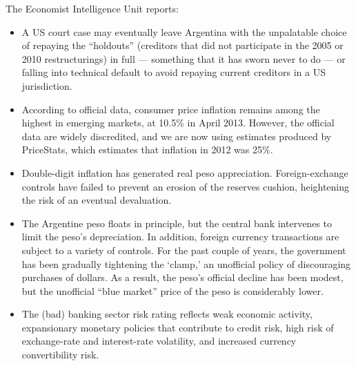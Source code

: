 \documentclass[letterpaper,12pt]{exam}
\begin{document}
\begin{questions}
The Economist Intelligence Unit reports:
\begin{itemize}
\item A US court case may eventually leave
Argentina with the unpalatable choice of repaying the ``holdouts'' (creditors that
did not participate in the 2005 or 2010 restructurings) in full --- something that it
has sworn never to do --- or falling into technical default to avoid repaying
current creditors in a US jurisdiction.

\item According to official data, consumer price inflation remains among the highest
in emerging markets, at 10.5\% in April 2013. However, the official data are
widely discredited, and we are now using estimates produced by PriceStats,
which estimates that inflation in 2012 was 25\%.

\item Double-digit inflation has generated real peso appreciation.
Foreign-exchange controls have failed to prevent an erosion of the reserves cushion,
heightening the risk of an eventual devaluation.

\item The Argentine peso floats in principle, but the central bank intervenes to limit
the peso's depreciation.
In addition, foreign currency transactions are subject to a variety of controls.
For the past couple of years, the government has been gradually tightening the `clamp,'
an unofficial policy of discouraging purchases of dollars.
As a result, the peso's official decline has been modest,
but the unofficial ``blue market'' price of the peso is considerably lower.

\item The (bad) banking sector risk rating reflects weak economic activity, expansionary
monetary policies that contribute to credit risk, high risk of exchange-rate
and interest-rate volatility, and increased currency convertibility risk.


\end{itemize}
\end{questions}
\end{document}
